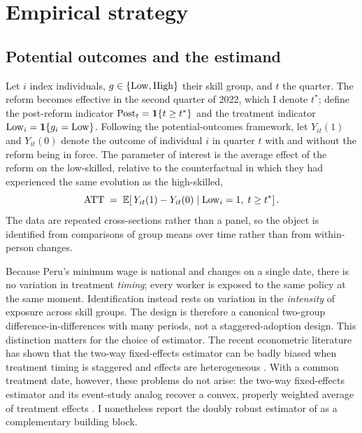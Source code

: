 \section{Empirical strategy}\label{sec:strategy}

\subsection{Potential outcomes and the estimand}

Let $i$ index individuals, $g\in\{\mathrm{Low},\mathrm{High}\}$ their skill group, and $t$ the
quarter. The reform becomes effective in the second quarter of 2022, which I denote
$t^{\ast}$; define the post-reform indicator $\mathrm{Post}_t=\mathbf{1}\{t\ge t^{\ast}\}$ and
the treatment indicator $\mathrm{Low}_i=\mathbf{1}\{g_i=\mathrm{Low}\}$. Following the potential-outcomes
framework, let $Y_{it}(1)$ and $Y_{it}(0)$ denote the outcome of individual $i$ in
quarter $t$ with and without the reform being in force. The parameter of interest is the
average effect of the reform on the low-skilled, relative to the counterfactual in which
they had experienced the same evolution as the high-skilled,
\begin{equation}
\mathrm{ATT} \;=\; \mathbb{E}\!\left[\,Y_{it}(1)-Y_{it}(0)\;\middle|\;\mathrm{Low}_i=1,\;t\ge t^{\ast}\right].
\end{equation}
The data are repeated cross-sections rather than a panel, so the object is identified from
comparisons of group means over time rather than from within-person changes.

Because Peru's minimum wage is national and changes on a single date, there is no variation
in treatment \emph{timing}; every worker is exposed to the same policy at the same moment.
Identification instead rests on variation in the \emph{intensity} of exposure across skill
groups. The design is therefore a canonical two-group difference-in-differences with many
periods, not a staggered-adoption design. This distinction matters for the choice of
estimator. The recent econometric literature has shown that the two-way fixed-effects
estimator can be badly biased when treatment timing is staggered and effects are
heterogeneous \citep{goodmanbacon_2021, dechaisemartin_2020, sun_abraham_2021,
callaway_santanna_2021}. With a common treatment date, however, these problems do not
arise: the two-way fixed-effects estimator and its event-study analog recover a convex,
properly weighted average of treatment effects \citep{roth_2023_trending,
baker_larcker_wang_2022}. I nonetheless report the doubly robust estimator of
\citet{santanna_zhao_2020} as a complementary building block.

